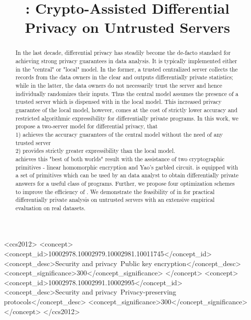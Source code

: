 \documentclass[sigconf]{acmart}
\begin{document}
\title{\system: Crypto-Assisted Differential Privacy on Untrusted Servers}
\author{}
\begin{abstract}
In the last decade, differential privacy has steadily become the de-facto standard for achieving strong privacy guarantees in data analysis. It is typically implemented either in the "central" or "local" model. In the former, a trusted centralized server collects the records from the data owners in the clear and outputs differentially private statistics; while in the latter, the data owners do not necessarily trust the server and hence individually randomizes their inputs.  Thus the central model assumes the presence of a trusted server which is dispensed with in the local model. This increased privacy guarantee of the local model, however, comes at the cost of strictly lower accuracy and restricted algorithmic expressibility for differentially private programs. In this work, we propose a  two-server model for differential privacy, \system  that  \\
1) achieves the accuracy guarantees of the central model without the need of any trusted server \\
2) provides strictly greater expressibility than the local model. \\
\system achieves this "best of both worlds" result with the assistance of two cryptographic primitives - linear homomorphic encryption and  Yao's garbled circuit. \system is equipped with a set of primitives which can be used by an data analyst to obtain differentially private answers for a useful class of programs. Further, we propose four optimization schemes to improve the efficiency of \system.  We demonstrate the feasibility of \system in for practical differentially private analysis on untrusted servers with an extensive empirical evaluation on real datasets.
\end{abstract}
\begin{CCSXML}
<ccs2012>
<concept>
<concept_id>10002978.10002979.10002981.10011745</concept_id>
<concept_desc>Security and privacy~Public key encryption</concept_desc>
<concept_significance>300</concept_significance>
</concept>
<concept>
<concept_id>10002978.10002991.10002995</concept_id>
<concept_desc>Security and privacy~Privacy-preserving protocols</concept_desc>
<concept_significance>300</concept_significance>
</concept>
</ccs2012>
\end{CCSXML}
\end{document}
